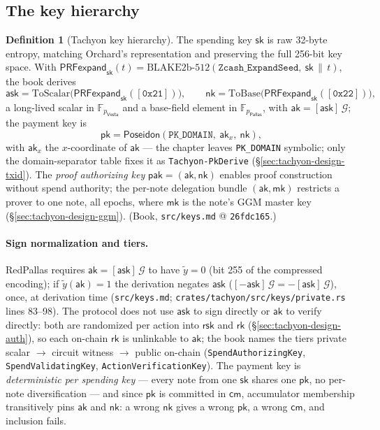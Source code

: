\documentclass[11pt,a4paper]{article}
\theoremstyle{definition}
\newtheorem{definition}[theorem]{Definition}
\newcommand{\F}{\mathbb{F}}
\newcommand{\cmsym}{\mathsf{cm}}
\newcommand{\rk}{\mathsf{rk}}
\newcommand{\Pallas}{\ensuremath{\mathsf{Pallas}}}
\newcommand{\Vesta}{\ensuremath{\mathsf{Vesta}}}
\newcommand{\ask}{\ensuremath{\mathsf{ask}}}
\newcommand{\aksym}{\ensuremath{\mathsf{ak}}}
\newcommand{\nksym}{\ensuremath{\mathsf{nk}}}
\newcommand{\rsk}{\ensuremath{\mathsf{rsk}}}
\begin{document}
\subsection{The key hierarchy}\label{sec:tachyon-design-keys}

\begin{definition}[Tachyon key hierarchy]\label{def:tachyon-design-keys}
The spending key $\mathsf{sk}$ is raw 32-byte entropy, matching Orchard's
representation and preserving the full 256-bit key space. With
$\mathsf{PRFexpand}_{\mathsf{sk}}(t) =
\text{BLAKE2b-512}(\texttt{Zcash\_ExpandSeed},\ \mathsf{sk} \,\|\, t)$,
the book derives
\[
\ask = \mathrm{ToScalar}\bigl(\mathsf{PRFexpand}_{\mathsf{sk}}
  ([\mathtt{0x21}])\bigr), \qquad
\nksym = \mathrm{ToBase}\bigl(\mathsf{PRFexpand}_{\mathsf{sk}}
  ([\mathtt{0x22}])\bigr),
\]
a long-lived scalar in $\F_{p_{\Vesta}}$ and a base-field element in
$\F_{p_{\Pallas}}$, with $\aksym = [\ask]\,\mathcal{G}$; the payment key is
\[
\mathsf{pk} = \mathsf{Poseidon}(\texttt{PK\_DOMAIN},\ \aksym_x,\ \nksym),
\]
with $\aksym_x$ the $x$-coordinate of $\aksym$ --- the chapter leaves
\texttt{PK\_DOMAIN} symbolic; only the domain-separator table fixes it as
\texttt{Tachyon-PkDerive} (\S\ref{sec:tachyon-design-txid}). The
\emph{proof authorizing key} $\mathsf{pak} = (\aksym, \nksym)$ enables
proof construction without spend authority; the per-note delegation bundle
$(\aksym, \mathsf{mk})$ restricts a prover to one note, all epochs, where
$\mathsf{mk}$ is the note's GGM master key
(\S\ref{sec:tachyon-design-ggm}). (Book, \texttt{src/keys.md} @
\texttt{26fdc165}.)
\end{definition}

\paragraph{Sign normalization and tiers.} RedPallas requires
$\aksym = [\ask]\,\mathcal{G}$ to have $\tilde{y} = 0$ (bit 255 of the
compressed encoding); if $\tilde{y}(\aksym) = 1$ the derivation negates
$\ask$ ($[-\ask]\,\mathcal{G} = -[\ask]\,\mathcal{G}$), once, at derivation
time (\texttt{src/keys.md}; \texttt{crates/tachyon/src/keys/private.rs}
lines 83--98). The protocol does not use $\ask$ to sign directly or
$\aksym$ to verify directly: both are randomized per action into
$\rsk$ and $\rk$
(\S\ref{sec:tachyon-design-auth}), so each on-chain $\rk$ is unlinkable to
$\aksym$; the book names the tiers private scalar $\to$ circuit witness
$\to$ public on-chain (\texttt{SpendAuthorizingKey},
\texttt{SpendValidatingKey}, \texttt{ActionVerificationKey}). The payment
key is \emph{deterministic per spending key} --- every note from one
$\mathsf{sk}$ shares one $\mathsf{pk}$, no per-note diversification --- and
since $\mathsf{pk}$ is committed in $\cmsym$, accumulator membership
transitively pins $\aksym$ and $\nksym$: a wrong $\nksym$ gives a wrong
$\mathsf{pk}$, a wrong $\cmsym$, and inclusion fails.
\end{document}

